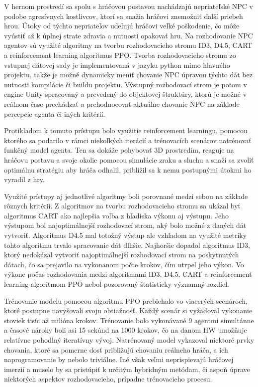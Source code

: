 \documentclass[slovak, master]{diploma}
\begin{document}
V hernom prostredí sa spolu s hráčovou postavou nachádzajú nepriateľské NPC v podobe agresívnych kostlivcov, ktorí sa snažia hráčovi znemožniť ďalší priebeh hrou. Útoky od týchto nepriateľov udeľujú hráčovi veľké poškodenie, čo môže vyústiť až k úplnej strate zdravia a nutnosti opakovať hru. Na rozhodovanie NPC agentov sú využité algoritmy na tvorbu rozhodovacieho stromu ID3, D4.5, CART a reinforcement learning algoritmus PPO. Tvorba rozhodovacieho stromu zo vstupnej dátovej sady je implementovaná v jazyku python mimo hlavného projektu, takže je možné dynamicky meniť chovanie NPC úpravou týchto dát bez nutnosti kompilácie či buildu projektu. Výstupný rozhodovací strom je potom v engine Unity spracovaný a prevedený do objektovej štruktúry, ktorú je možné v reálnom čase prechádzať a prehodnocovať aktuálne chovanie NPC na základe percepcie agenta či iných kritérií. 

Protikladom k tomuto prístupu bolo využitie reinforcement learningu, pomocou ktorého sa podarilo v rámci niekoľkých iterácií a trénovacích scenárov natrénovať funkčný model agenta. Ten sa dokáže pohybovať 3D prostredím, reaguje na hráčovu postavu a svoje okolie pomocou simulácie zraku a sluchu a snaží sa zvoliť optimálnu stratégiu aby hráča odhalil, priblížil sa k nemu postupnými útokmi ho vyradil z hry.

Využité prístupy aj jednotlivé algoritmy boli porovnané medzi sebou na základe rôznych kritérií. Z algoritmov na tvorbu rozhodovacieho stromu sa ukázal byť algoritmus CART ako najlepšia voľba z hľadiska výkonu aj výstupu. Jeho výstupom bol najoptimálnejší rozhodovací strom, aký bolo možné z daných dát vytvoriť. Algoritmus D4.5 mal totožný výstup ale vzhľadom na využité metriky tohto algoritmu trvalo spracovanie dát dlhšie. Najhoršie dopadol algoritmus ID3, ktorý nedokázal vytvoriť najoptimálnejší rozhodovací strom na poskytnutých dátach, čo sa prejavilo na vykonanom počte krokov, čím utrpel jeho výkon. Vo výkone počas rozhodovania medzi algoritmami ID3, D4.5, CART a reinforcement learning algoritmom PPO nebol pozorovaný štatisticky významný rozdiel. 

Trénovanie modelu pomocou algoritmu PPO prebiehalo vo viacerých scenároch, ktoré postupne navyšovali svoju obtiažnosť. Každý scenár si vyžadoval vykonanie stoviek tisíc až milióna krokov. Trénovanie bolo vykonávané 9 agentmi simultánne a časové nároky boli asi 15 sekúnd na 1000 krokov, čo na danom HW umožňuje relatívne pohodlný iteratívny vývoj. Natrénovaný model vykazoval niektoré prvky chovania, ktoré sa pomerne dosť približujú chovaniu reálneho hráča, a ich naprogramovanie by nebolo triviálne. Iné však veľmi neprispievajú hráčovej imerzií a muselo by sa pristúpiť k určitým hybridným metódam, či aspoň úprave niektorých aspektov rozhodovacieho, prípadne trénovacieho procesu. 
\end{document}
